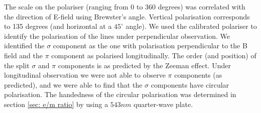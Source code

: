 \documentclass[11pt]{article}
\begin{document}
The scale on the polariser (ranging from 0 to 360 degrees) was correlated with the direction of E-field using Brewster's angle. Vertical polarisation corresponds to 135 degrees (and horizontal at a $45^\circ$ angle). We used the calibrated polariser to identify the polarisation of the lines under perpendicular observation. We identified the $\sigma$ component as the one with polarisation perpendicular to the B field and the $\pi$ component as polarised longitudinally. The order (and position) of the split $\sigma$ and $\pi$ components is as predicted by the Zeeman effect. Under longitudinal observation we were not able to observe $\pi$ components (as predicted), and we were able to find that the $\sigma$ components have circular polarisation. The handedness of the circular polarisation was determined in section \ref{sec: e/m ratio} by using a $543 \si{nm}$ quarter-wave plate. 
\end{document}
